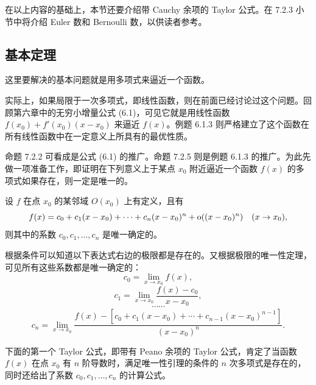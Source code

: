 在以上内容的基础上，本节还要介绍带 Cauchy 余项的 Taylor 公式。在 7.2.3 小节中将介绍 Euler 数和 Bernoulli 数，以供读者参考。

\subsection{基本定理}

这里要解决的基本问题就是用多项式来逼近一个函数。

实际上，如果局限于一次多项式，即线性函数，则在前面已经讨论过这个问题。回顾第六章中的无穷小增量公式 (6.1)，可见它就是用线性函数 $f(x_0)+f'(x_0)(x-x_0)$ 来逼近 $f(x)$。例题 6.1.3 则严格建立了这个函数在所有线性函数中在一定意义上所具有的最优性质。

命题 7.2.2 可看成是公式 (6.1) 的推广。命题 7.2.5 则是例题 6.1.3 的推广。为此先做一项准备工作，即证明在下列意义上于某点 $x_0$ 附近逼近一个函数 $f(x)$ 的多项式如果存在，则一定是唯一的。

\begin{xproposition}[7.2.1（唯一性引理）]
设 $f$ 在点 $x_0$ 的某邻域 $O(x_0)$ 上有定义，且有
\[
  f(x)=c_0+c_1(x-x_0)+\cdots+c_n(x-x_0)^n+\mathrm{o}((x-x_0)^n)\quad(x\to x_0),
\]
则其中的系数 $c_0,c_1,\ldots,c_n$ 是唯一确定的。
\end{xproposition}
\begin{xproof}
根据条件可以知道以下表达式右边的极限都是存在的。又根据极限的唯一性定理，可见所有这些系数都是唯一确定的：
\[
  c_0=\lim_{x\to x_0}f(x),
\]
\[
  c_1=\lim_{x\to x_0}\frac{f(x)-c_0}{x-x_0},
\]
\[
  \cdots\cdots
\]
\[
  c_n=\lim_{x\to x_0}
  \frac{f(x)-[c_0+c_1(x-x_0)+\cdots+c_{n-1}(x-x_0)^{n-1}]}{(x-x_0)^n}.
\]
\end{xproof}

下面的第一个 Taylor 公式，即带有 Peano 余项的 Taylor 公式，肯定了当函数 $f(x)$ 在点 $x_0$ 有 $n$ 阶导数时，满足唯一性引理的条件的 $n$ 次多项式是存在的，同时还给出了系数 $c_0,c_1,\ldots,c_n$ 的计算公式。

